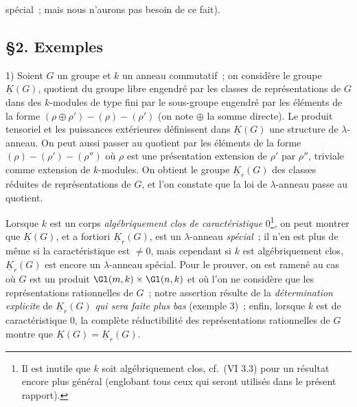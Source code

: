 spécial~; mais nous n'aurons pas besoin de ce fait).

\subsection*{\S 2. Exemples}

1) Soient $G$ un groupe et $k$ un anneau commutatif~; on considère le groupe $\underline{K}(G)$, quotient du groupe libre engendré par les classes de représentations de $G$ dans des $k$-modules de type fini par le sous-groupe engendré par les éléments de la forme $(\rho\oplus\rho')-(\rho)-(\rho')$ (on note $\oplus$ la somme directe). Le produit tensoriel et les puissances extérieures définissent dans $\underline{K}(G)$ une structure de $\lambda$-anneau. On peut aussi passer au quotient par les éléments de la forme $(\rho)-(\rho')-(\rho'')$ où $\rho$ est une présentation extension de $\rho'$ par $\rho''$, triviale comme extension de $k$-modules. On obtient le groupe $\underline{K}_r(G)$ des classes réduites de représentations de $G$, et l'on constate que la loi de $\lambda$-anneau passe au quotient.

Lorsque $k$ est un corps \emph{algébriquement clos de caractéristique} $0$\footnote{Il est inutile que $k$ soit algébriquement clos, cf.\ (VI 3.3) pour un résultat encore plus général (englobant tous ceux qui seront utilisés dans le présent rapport).}, on peut montrer que $\underline{K}(G)$, et a fortiori $\underline{K}_r(G)$, est un $\lambda$-anneau \emph{spécial}~; il n'en est plus de même si la caractéristique est $\neq 0$, mais cependant si $k$ est algébriquement clos\footnotemark[\value{footnote}], $\underline{K}_r(G)$ est encore un $\lambda$-anneau spécial. Pour le prouver, on est ramené au cas où $G$ est un produit $\Gl(m,k)\times\Gl(n,k)$ et où l'on ne considère que les représentations rationnelles de $G$~; notre assertion résulte de la \emph{détermination explicite} de $\underline{K}_r(G)$ \emph{qui sera faite plus bas} (exemple 3)~; enfin, lorsque $k$ est de caractéristique $0$, la complète réductibilité des représentations rationnelles de $G$ montre que $\underline{K}(G)=\underline{K}_r(G)$.

